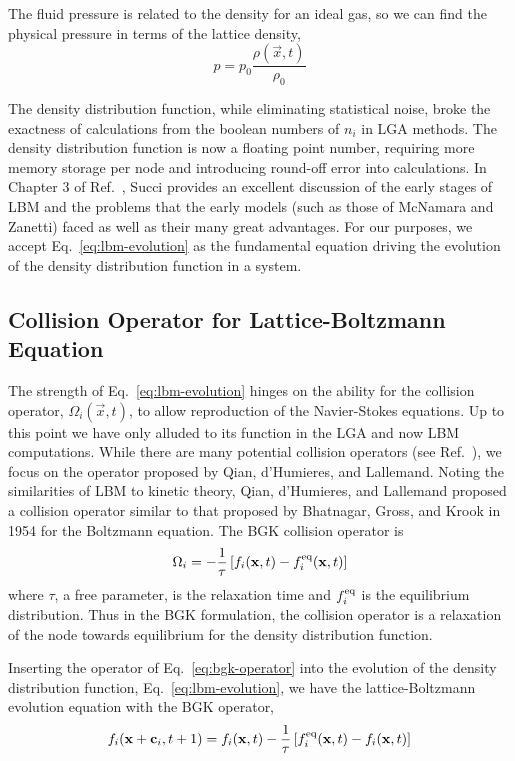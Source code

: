 The fluid pressure is related to the density for an ideal gas, so we can find the physical pressure in terms of the lattice density,
\begin{equation}
	p = p_0\frac{\rho(\vec{x},t)}{\rho_0}
\end{equation}

The density distribution function, while eliminating statistical noise, broke the exactness of calculations from the boolean numbers of $n_i$ in LGA methods. The density distribution function is now a floating point number, requiring more memory storage per node and introducing round-off error into calculations. In Chapter 3 of Ref.~\cite{succi2001lattice}, Succi provides an excellent discussion of the early stages of LBM and the problems that the early models (such as those of McNamara and Zanetti) faced as well as their many great advantages. For our purposes, we accept Eq.~\ref{eq:lbm-evolution} as the fundamental equation driving the evolution of the density distribution function in a system.



\subsection{Collision Operator for Lattice-Boltzmann Equation}

The strength of Eq.~\ref{eq:lbm-evolution} hinges on the ability for the collision operator, $\Omega_i(\vec{x},t)$, to allow reproduction of the Navier-Stokes equations. Up to this point we have only alluded to its function in the LGA and now LBM computations. While there are many potential collision operators (see Ref.~\cite{succi2001lattice}), we focus on the operator proposed by Qian, d’Humieres, and Lallemand.\cite{qian1992lattice} Noting the similarities of LBM to kinetic theory, Qian, d'Humieres, and Lallemand proposed a collision operator similar to that proposed by Bhatnagar, Gross, and Krook in 1954 for the Boltzmann equation.\cite{Bhatnagar1954a} The BGK collision operator is
\begin{equation}\label{eq:bgk-operator}
	\Omega_i = -\frac{1}{\tau}\left[f_i(\mathbf{x},t) - f_i^{\text{eq}}(\mathbf{x},t)\right]
\end{equation}
where $\tau$, a free parameter, is the relaxation time and $f_i^{\text{eq}}$ is the equilibrium distribution. Thus in the BGK formulation, the collision operator is a relaxation of the node towards equilibrium for the density distribution function.\cite{Bhatnagar1954a}

Inserting the operator of Eq.~\ref{eq:bgk-operator} into the evolution of the density distribution function, Eq.~\ref{eq:lbm-evolution}, we have the lattice-Boltzmann evolution equation with the BGK operator,
\begin{equation}\label{eq:lbm-bgk}
	f_i(\mathbf{x}+\mathbf{c}_i, t + 1) = f_i(\mathbf{x},t) - \frac{1}{\tau}\left[f_i^{\text{eq}}(\mathbf{x},t) - f_i(\mathbf{x},t)\right]
\end{equation}

